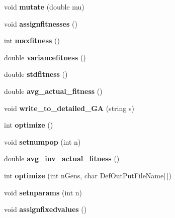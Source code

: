 \begin{DoxyCompactItemize}
void {\bfseries mutate} (double mu)
\item 
\mbox{\label{class_c_g_a_a0835a8cb5e2209f65d514e763bc4c675}} 
void {\bfseries assignfitnesses} ()
\item 
\mbox{\label{class_c_g_a_ae374fd42598785c875dc15385d301979}} 
int {\bfseries maxfitness} ()
\item 
\mbox{\label{class_c_g_a_a31c77c8feb0d46874d55a4c484ea6bd7}} 
double {\bfseries variancefitness} ()
\item 
\mbox{\label{class_c_g_a_a1e8c9a70d7a750ec27798aad7451adc0}} 
double {\bfseries stdfitness} ()
\item 
\mbox{\label{class_c_g_a_a1a70da0392499b67586e3c76efee882e}} 
double {\bfseries avg\+\_\+actual\+\_\+fitness} ()
\item 
\mbox{\label{class_c_g_a_af0526ef555f9a5bb8c42f72afdbeb62c}} 
void {\bfseries write\+\_\+to\+\_\+detailed\+\_\+\+GA} (string s)
\item 
\mbox{\label{class_c_g_a_a62d65742838fb23f2bdcc0866127e578}} 
int {\bfseries optimize} ()
\item 
\mbox{\label{class_c_g_a_aec6b106d586462caec542ce2284d8f7d}} 
void {\bfseries setnumpop} (int n)
\item 
\mbox{\label{class_c_g_a_a5a7fe5c7fec380322936aa2b7245b736}} 
double {\bfseries avg\+\_\+inv\+\_\+actual\+\_\+fitness} ()
\item 
\mbox{\label{class_c_g_a_aef4fb6b1f023cb57189a0f4c722b23c4}} 
int {\bfseries optimize} (int n\+Gens, char Def\+Out\+Put\+File\+Name\mbox{[}$\,$\mbox{]})
\item 
\mbox{\label{class_c_g_a_ae7d8e970b4048de9fb0360a0a5814a52}} 
void {\bfseries setnparams} (int n)
\item 
\mbox{\label{class_c_g_a_a14a04792f553fe78d471c9743c648049}} 
void {\bfseries assignfixedvalues} ()
\item 

\end{DoxyCompactItemize}
